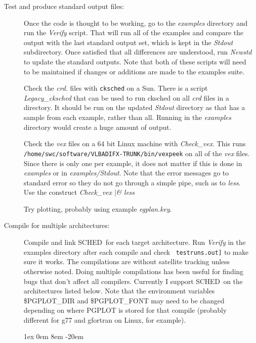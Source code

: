 \documentclass{report}
\newcommand{\schedb}{{\sc SCHED~}}
\begin{document}
\begin{description}
\item [Test and produce standard output files:]

Once the code is thought to be working, go to the {\sl examples} directory
and run the {\sl Verify} script.  That will run all of the examples and 
compare the output with the last standard output set, which is kept in the
{\sl Stdout} subdirectory.  Once satisfied that all differences are 
understood, run {\sl Newstd} to update the standard outputs.  Note that 
both of these scripts will need to be maintained if changes or additions
are made to the examples suite.

Check the {\sl crd.} files with {\tt cksched} on a Sun.  There is a 
script {\sl Legacy\_cksched} that can be used to run cksched on all
{\sl crd} files in a directory.  It should be run on the updated
{\sl Stdout} directory as that has a sample from each example, rather 
than all.  Running in the {\sl examples} directory would create a 
huge amount of output.

Check the {\sl vex} files on a 64 bit Linux machine with {\sl
Check\_vex}.  This runs {\tt
/home/swc/software/VLBADIFX-TRUNK/bin/vexpeek} on all of the {\sl vex}
files.  Since there is only one per example, it does not matter if
this is done in {\sl examples} or in {\sl examples/Stdout}.  Note that
the error messages go to standard error so they do not go through a
simple pipe, such as to {\sl less}.  Use the construct {\sl Check\_vex
$|$\& less}

Try plotting, probably using example {\sl egplan.key}.


\item [Compile for multiple architectures:]

Compile and link \schedb for each target architecture.  Run {\sl
Verify} in the examples directory after each compile and check {\tt
testruns.out]} to make sure it works.  The compilations are without
satellite tracking unless otherwise noted.  Doing multiple
compilations has been useful for finding bugs that don't affect all
compilers.  Currently I support \schedb on the architectures listed
below.  Note that the environment variables \$PGPLOT\_DIR and \$PGPLOT\_FONT
may need to be changed depending on where PGPLOT is stored for that
compile (probably different for g77 and gfortran on Linux, for
example).

\begin{list}{}{\parsep 1ex  \itemsep 0em
                 \leftmargin 8em  \itemindent -20em }


\end{list}
\end{description}
\end{document}
